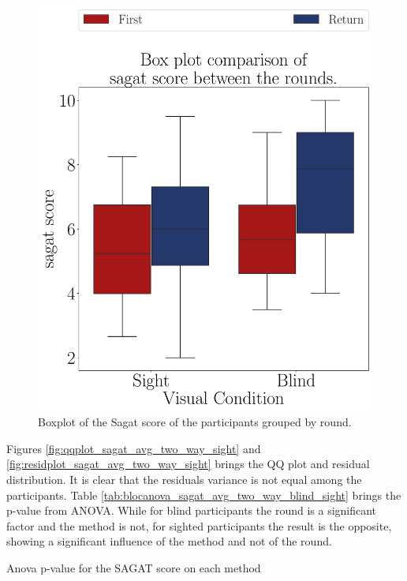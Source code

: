 \begin{figure}[!thb]
\begin{minipage}{0.45\textwidth}
        \includegraphics[width = 0.8\linewidth]{Resultados/Sagat/Figuras/pdf/boxplot_sagat_4_rounds.pdf}
        \caption{Boxplot of the Sagat score of the participants grouped by round.}
        \label{fig:boxplot_sagat_4_rounds}
    \end{minipage}
\end{figure}

Figures \ref{fig:qqplot_sagat_avg_two_way_sight} and \ref{fig:residplot_sagat_avg_two_way_sight} brings the QQ plot and residual distribution. It is clear that the residuals variance is not equal among the participants. Table \ref{tab:blocanova_sagat_avg_two_way_blind_sight} brings the p-value from ANOVA. While for blind participants the round is a significant factor and the method is not, for sighted participants the result is the opposite, showing a significant influence of the method and not of the round.

\begin{table}[!thb]
    \caption{Anova p-value for the SAGAT score on each method}
    \label{tab:blocanova_sagat_avg_two_way_blind_sight}
\begin{minipage}{0.45\textwidth}
    
\end{minipage}
\begin{minipage}{0.45\textwidth}
        
\end{minipage}
\end{table}



